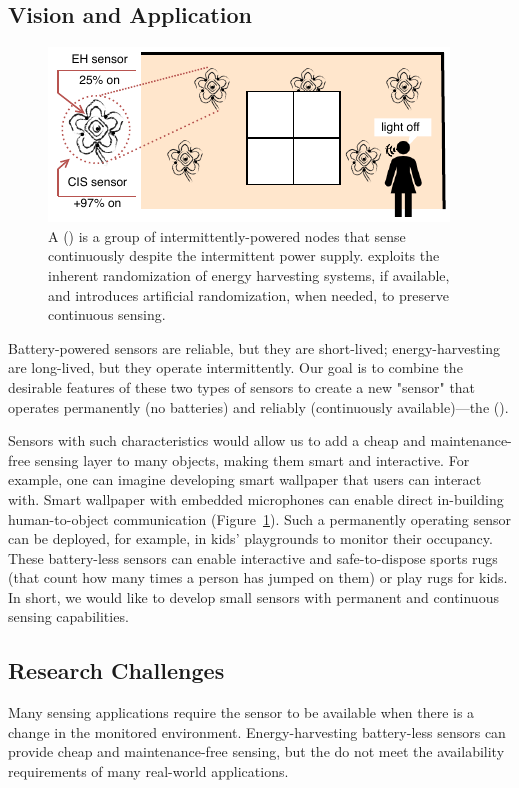 \subsection{Vision and Application}
%
\begin{figure}[t]
	\centering
	\includegraphics[width=\columnwidth]{figures/smart_fabric}
	\caption{A \fullsys (\sys) is a group of intermittently-powered nodes that sense continuously despite the intermittent power supply. \sys exploits the inherent randomization of energy harvesting systems, if available, and introduces artificial randomization, when needed, to preserve continuous sensing.
	}
	\label{fig:smart_fabric}
\end{figure}
%
Battery-powered sensors are reliable, but they are short-lived; energy-harvesting are long-lived, but they operate intermittently. Our goal is to combine the desirable features of these two types of sensors to 
create a new "sensor" that operates permanently (no batteries) and reliably (continuously available)---the \fullsys (\sys).

Sensors with such characteristics would allow us to add a cheap and maintenance-free sensing layer to many objects, making them smart and interactive. 
For example, one can imagine developing smart wallpaper that users can interact with. 
Smart wallpaper with embedded microphones can enable direct in-building human-to-object communication (Figure~\ref{fig:smart_fabric}). Such a permanently operating sensor can be deployed, for example, in kids' playgrounds to monitor their occupancy. These battery-less sensors can enable
interactive and safe-to-dispose sports rugs (that count how many times a person has jumped on them) or play rugs for kids.
In short, we would like to develop small sensors with permanent and continuous sensing capabilities.  
%
\subsection{Research Challenges}
Many sensing applications require the sensor to be available when there is a change in the monitored environment.
Energy-harvesting battery-less sensors can provide cheap and maintenance-free sensing, but the do not meet the availability requirements of many real-world applications. 


